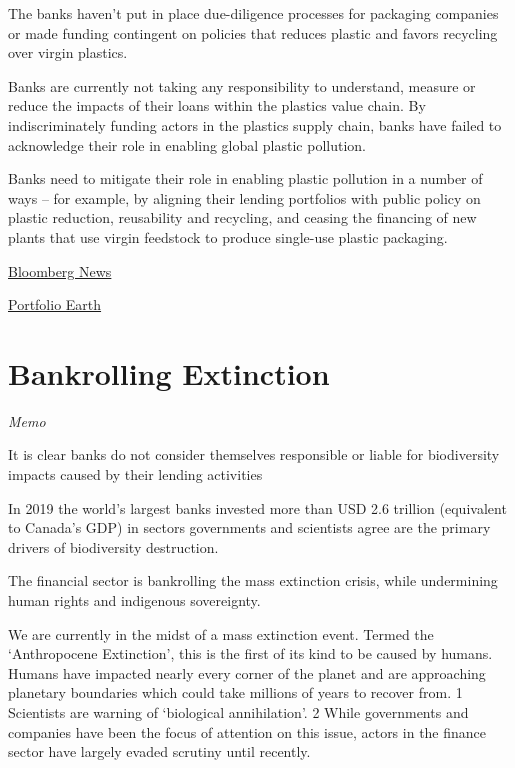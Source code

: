 \documentclass[
]{book}
\begin{document}
The banks haven't put in place due-diligence processes for packaging companies or
made funding contingent on policies that reduces plastic and favors recycling
over virgin plastics.

Banks are currently not taking any responsibility to understand, measure or reduce
the impacts of their loans within the plastics value chain.
By indiscriminately funding actors in the plastics supply chain, banks have failed
to acknowledge their role in enabling global plastic pollution.

Banks need to mitigate their role in enabling plastic pollution in a number of ways
-- for example, by aligning their lending portfolios with public policy
on plastic reduction, reusability and recycling,
and ceasing the financing of new plants that use virgin feedstock
to produce single-use plastic packaging.

\href{https://www.bloomberg.com/news/articles/2021-01-07/banks-directed-1-7-trillion-to-firms-causing-plastic-pollution}{Bloomberg News}

\href{https://portfolio.earth/}{Portfolio Earth}

\hypertarget{bankrolling-extinction}{%
\section{Bankrolling Extinction}\label{bankrolling-extinction}}

\emph{Memo}

It is clear banks
do not consider
themselves
responsible
or liable for
biodiversity
impacts caused
by their lending
activities

In 2019 the world's largest banks invested more than USD 2.6 trillion (equivalent to Canada's GDP) in sectors governments and scientists agree are the primary drivers of biodiversity destruction.

The financial sector is bankrolling the mass extinction crisis, while undermining human rights and indigenous sovereignty.

We are currently in the midst of a mass
extinction event. Termed the `Anthropocene
Extinction', this is the first of its kind to be
caused by humans. Humans have impacted
nearly every corner of the planet and are
approaching planetary boundaries which
could take millions of years to recover
from. 1 Scientists are warning of `biological
annihilation'. 2 While governments and
companies have been the focus of attention
on this issue, actors in the finance sector
have largely evaded scrutiny until recently.
\end{document}
